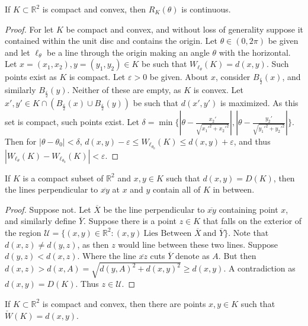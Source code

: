 \documentclass[crop=false,class=article,oneside]{standalone}
\begin{document}
        \begin{theorem}
        If $K\subset \mathbb{R}^2$ is compact and convex, then $R_K(\theta)$ is continuous.
        \end{theorem}
        \begin{proof}
        For let $K$ be compact and convex, and without loss of generality suppose it contained within the unit disc and contains the origin. Let $\theta\in (0,2\pi)$ be given and let $\ell_{\theta}$ be a line through the origin making an angle $\theta$ with the horizontal. Let $x=(x_1,x_2),y=(y_1,y_2)\in K$ be such that $W_{\ell_{\theta}}(K) = d(x,y)$. Such points exist as $K$ is compact. Let $\varepsilon>0$ be given. About $x$, consider $B_{\frac{\varepsilon}{2}}(x)$, and similarly $B_{\frac{\varepsilon}{2}}(y)$. Neither of these are empty, as $K$ is convex. Let $x',y'\in K\cap(B_{\frac{\varepsilon}{2}}(x)\cup B_{\frac{\varepsilon}{2}}(y))$ be such that $d(x',y')$ is maximized. As this set is compact, such points exist. Let $\delta = \min\{|\theta-\frac{x_2'}{\sqrt{x_1'^2+x_2'^2}}|,|\theta-\frac{y_2'}{\sqrt{y_1'^2+y_2'^2}}|\}$. Then for $|\theta-\theta_0|<\delta$, $d(x,y)-\varepsilon \leq W_{\ell_{\theta_0}}(K)\leq d(x,y)+\varepsilon$, and thus $|W_{\ell_\theta}(K)-W_{\ell_{\theta_0}}(K)| < \varepsilon$.
        \end{proof}
        \begin{lemma}
        If $K$ is a compact subset of $\mathbb{R}^2$ and $x,y\in K$ such that $d(x,y)=D(K)$, then the lines perpendicular to $\overline{xy}$ at $x$ and $y$ contain all of $K$ in between.
        \end{lemma}
        \begin{proof}
        Suppose not. Let $\overline{X}$ be the line perpendicular to $\overline{xy}$ containing point $x$, and similarly define $\overline{Y}$. Suppose there is a point $z\in K$ that falls on the exterior of the region $\mathcal{U} = \{(x,y)\in \mathbb{R}^2: (x,y)\ \textrm{Lies Between } \overline{X}\ \textrm{and } \overline{Y}\}$. Note that $d(x,z)\ne d(y,z)$, as then $z$ would line between these two lines. Suppose $d(y,z)<d(x,z)$. Where the line $\overline{xz}$ cuts $\overline{Y}$ denote as $A$. But then $d(x,z) > d(x,A) = \sqrt{d(y,A)^2+d(x,y)^2}\geq d(x,y)$. A contradiction as $d(x,y) = D(K)$. Thus $z\in \mathcal{U}$.
        \end{proof}
        \begin{theorem}
        If $K\subset \mathbb{R}^2$ is compact and convex, then there are points $x,y\in K$ such that $\check{W}(K)=d(x,y)$.
        \end{theorem}
\end{document}
